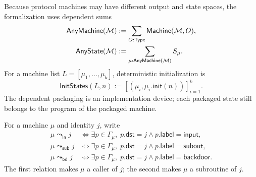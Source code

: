 \begin{definition}
\label{def:uc-any-machine}
\leanok
Because protocol machines may have different output and state spaces, the
formalization uses dependent sums
\[
\begin{aligned}
  \mathsf{AnyMachine}(\mathcal{M})
    &:=\sum_{O:\mathsf{Type}}\mathsf{Machine}(\mathcal{M},O),\\
  \mathsf{AnyState}(\mathcal{M})
    &:=\sum_{\mu:\mathsf{AnyMachine}(\mathcal{M})}S_\mu.
\end{aligned}
\]
For a machine list \(L=[\mu_1,\ldots,\mu_k]\), deterministic initialization is
\[
  \mathsf{InitStates}(L,n)
  :=[(\mu_i,\mu_i.\mathsf{init}(n))]_{i=1}^{k}.
\]
The dependent packaging is an implementation device; each packaged state still
belongs to the program of the packaged machine.
\end{definition}

\begin{definition}
\label{def:uc-port-relations}
\leanok
For a machine \(\mu\) and identity \(j\), write
\[
\begin{aligned}
  \mu\leadsto_{\mathsf{in}}j
  &\Longleftrightarrow
    \exists p\in\Gamma_\mu,\;
      p.\mathsf{dst}=j\land p.\mathsf{label}=\mathsf{input},\\
  \mu\leadsto_{\mathsf{sub}}j
  &\Longleftrightarrow
    \exists p\in\Gamma_\mu,\;
      p.\mathsf{dst}=j\land p.\mathsf{label}=\mathsf{subout},\\
  \mu\leadsto_{\mathsf{bd}}j
  &\Longleftrightarrow
    \exists p\in\Gamma_\mu,\;
      p.\mathsf{dst}=j\land p.\mathsf{label}=\mathsf{backdoor}.
\end{aligned}
\]
The first relation makes \(\mu\) a caller of \(j\); the second makes \(\mu\)
a subroutine of \(j\).
\end{definition}

